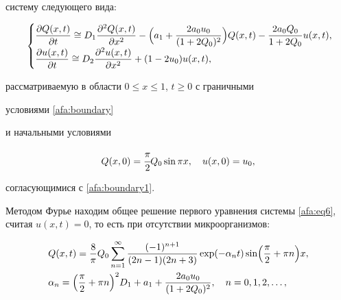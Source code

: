 систему следующего вида:

\begin{equation}

\label{afa:eq6}

\begin{cases}

\displaystyle

\frac{\partial Q(x,t)}{\partial t}\cong 

D_1 \frac{\partial^2Q(x,t)}{\partial x^2}-

\Bigl(a_1 +\frac{2a_0 u_0 }{(1+2Q_0)^2} \Bigr)Q(x,t)-

\frac{2a_0 Q_0 }{1+2Q_0 }u(x,t), \\[2mm]

\displaystyle

\frac{\partial u(x,t)}{\partial t} \cong 

D_2 \frac{\partial ^2u(x,t)}{\partial x^2}+(1-2u_0 )u(x,t),

\end{cases} \hspace{-5mm}

\end{equation}

рассматриваемую в области $0\le x\le 1$, $t\ge 0$ с граничными

условиями \eqref{afa:boundary}

и начальными условиями 

\begin{equation}

\label{afa:boundary2}

Q(x, 0)=\cfrac{\pi }{2} Q_0 \sin \pi x, \quad u(x, 0)=u_0,

\end{equation}

согласующимися с \eqref{afa:boundary1}.



Методом Фурье находим общее решение первого уравнения системы \eqref{afa:eq6}, считая $u(x, t)=0$, то есть при отсутствии микроорганизмов:

\begin{equation}

\label{afa:eq7}

\begin{aligned}

& Q(x, t)=\frac{8}{\pi} Q_0

\sum\limits_{n=1}^\infty 

\frac{(-1)^{n+1}}{(2n-1)(2n+3)} \exp({-\alpha_n t})  \sin \Bigl(\frac{\pi }{2}+\pi n \Bigr)x,\\

& \alpha_n=\Bigl( \frac{\pi }{2}+\pi n\Bigr)^2D_1 +a_1 +\frac{2a_0 u_0 }{(1+2Q_0 )^2},\quad n=0, 1, 2,\ldots,

\end{aligned}

\end{equation}



